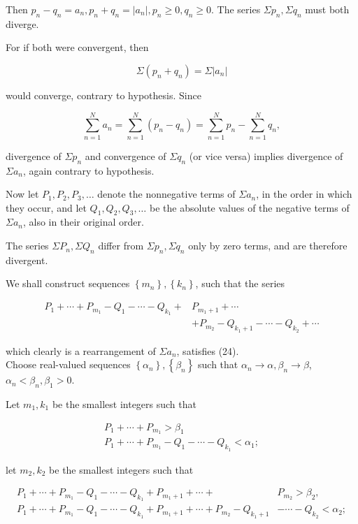 \documentclass[10pt]{article}
\begin{document}
Then $p_{n}-q_{n}=a_{n}, p_{n}+q_{n}=\left|a_{n}\right|, p_{n} \geq 0, q_{n} \geq 0$. The series $\Sigma p_{n}, \Sigma q_{n}$ must both diverge.

For if both were convergent, then

$$
\Sigma\left(p_{n}+q_{n}\right)=\Sigma\left|a_{n}\right|
$$

would converge, contrary to hypothesis. Since

$$
\sum_{n=1}^{N} a_{n}=\sum_{n=1}^{N}\left(p_{n}-q_{n}\right)=\sum_{n=1}^{N} p_{n}-\sum_{n=1}^{N} q_{n},
$$

divergence of $\Sigma p_{n}$ and convergence of $\Sigma q_{n}$ (or vice versa) implies divergence of $\Sigma a_{n}$, again contrary to hypothesis.

Now let $P_{1}, P_{2}, P_{3}, \ldots$ denote the nonnegative terms of $\Sigma a_{n}$, in the order in which they occur, and let $Q_{1}, Q_{2}, Q_{3}, \ldots$ be the absolute values of the negative terms of $\Sigma a_{n}$, also in their original order.

The series $\Sigma P_{n}, \Sigma Q_{n}$ differ from $\Sigma p_{n}, \Sigma q_{n}$ only by zero terms, and are therefore divergent.

We shall construct sequences $\left\{m_{n}\right\},\left\{k_{n}\right\}$, such that the series


\begin{align*}
P_{1}+\cdots+P_{m_{1}}-Q_{1}-\cdots-Q_{k_{1}}+ & P_{m_{1}+1}+\cdots  \tag{25}\\
& +P_{m_{2}}-Q_{k_{1}+1}-\cdots-Q_{k_{2}}+\cdots
\end{align*}


which clearly is a rearrangement of $\Sigma a_{n}$, satisfies (24).\\
Choose real-valued sequences $\left\{\alpha_{n}\right\},\left\{\beta_{n}\right\}$ such that $\alpha_{n} \rightarrow \alpha, \beta_{n} \rightarrow \beta$, $\alpha_{n}<\beta_{n}, \beta_{1}>0$.

Let $m_{1}, k_{1}$ be the smallest integers such that

$$
\begin{gathered}
P_{1}+\cdots+P_{m_{1}}>\beta_{1} \\
P_{1}+\cdots+P_{m_{1}}-Q_{1}-\cdots-Q_{k_{1}}<\alpha_{1} ;
\end{gathered}
$$

let $m_{2}, k_{2}$ be the smallest integers such that

$$
\begin{aligned}
P_{1}+\cdots+P_{m_{1}}-Q_{1}-\cdots-Q_{k_{1}}+P_{m_{1}+1}+\cdots+ & P_{m_{2}}>\beta_{2}, \\
P_{1}+\cdots+P_{m_{1}}-Q_{1}-\cdots-Q_{k_{1}}+P_{m_{1}+1}+\cdots+P_{m_{2}}-Q_{k_{1}+1} & -\cdots-Q_{k_{2}}<\alpha_{2} ;
\end{aligned}
$$
\end{document}
